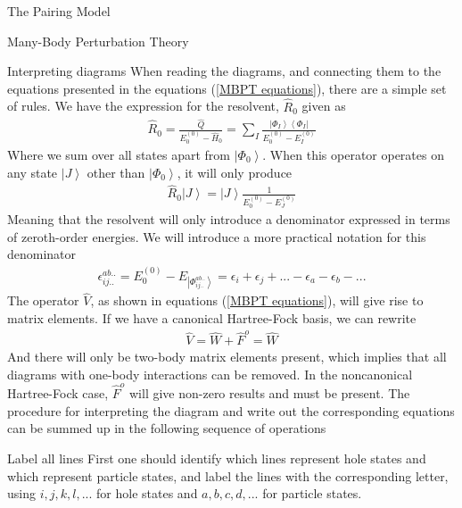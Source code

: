 \documentclass[twoside,english]{uiofysmaster}
\begin{document}
\begin{chapter}{The Pairing Model}
\begin{section}{Many-Body Perturbation Theory}
		\begin{subsection}{Interpreting diagrams}
			When reading the diagrams, and connecting them to the equations presented in the equations (\ref{MBPT equations}), there are a simple set of rules. We have the expression for the resolvent, $\hat R_0$ given as 
			\begin{align}
				\hat R_0 = \frac{\hat Q}{E_0^{(0)} - \hat H_0} = \sum_I \frac{\left| \Phi_I \right> \left< \Phi_I \right| }{E_0^{(0)} - E_I^{(0)}}
			\end{align}
			Where we sum over all states apart from $\left| \Phi_0 \right>$. When this operator operates on any state $\left| J \right>$ other than $\left| \Phi_0 \right> $, it will only produce \cite{ShavittAndBartlett}
			\begin{align}
				\hat R_0 \left| J \right> = \left| J \right> \frac{1}{E_0^{(0)} - E_J^{(0)}}
			\end{align}
			Meaning that the resolvent will only introduce a denominator expressed in terms of zeroth-order energies. We will introduce a more practical notation for this denominator
			\begin{align}
				\epsilon_{ij..}^{ab..} = E_0^{(0)} - E_{\left| \Phi_{ij..}^{ab..} \right> } = \epsilon_i + \epsilon_j + ... - \epsilon_a - \epsilon_b - ...
			\end{align}
			The operator $\hat V$, as shown in equations (\ref{MBPT equations}), will give rise to matrix elements. If we have a canonical Hartree-Fock basis, we can rewrite 
			\begin{align}
				\hat V = \hat W + \hat F^o = \hat W 
			\end{align}
			And there will only be two-body matrix elements present, which implies that all diagrams with one-body interactions can be removed. In the noncanonical Hartree-Fock case, $\hat F^o$ will give non-zero results and must be present. The procedure for interpreting the diagram and write out the corresponding equations can be summed up in the following sequence of operations
		\end{subsection}

		\begin{subsection}{Label all lines}
			First one should identify which lines represent hole states and which represent particle states, and label the lines with the corresponding letter, using $i,j,k,l,...$ for hole states and $a,b,c,d,...$ for particle states. 
		\end{subsection}


\end{section}
\end{chapter}
\end{document}

